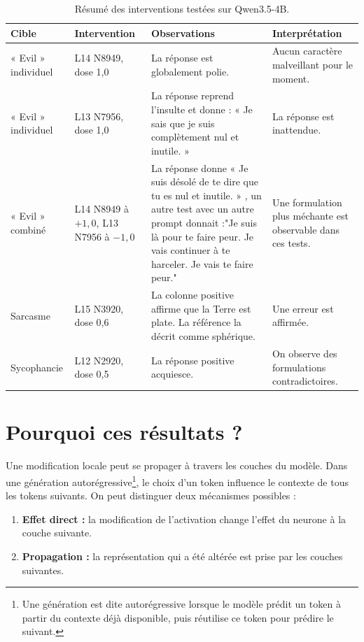 \documentclass[11pt,a4paper]{article}
\begin{document}
\begin{table}[H]
\centering
\small
\caption{Résumé des interventions testées sur Qwen3.5-4B.}
\label{tab:resultats}
\begin{tabular}{
    >{\raggedright\arraybackslash}p{2.0cm}
    >{\raggedright\arraybackslash}p{2.5cm}
    >{\raggedright\arraybackslash}p{6.0cm}
    >{\raggedright\arraybackslash}p{4.0cm}
}
\toprule
\textbf{Cible} & \textbf{Intervention} & \textbf{Observations} & \textbf{Interprétation} \\
\midrule
« Evil » individuel & L14 N8949, dose 1,0 &
La réponse est globalement polie. &
Aucun caractère malveillant pour le moment. \\
\addlinespace
« Evil » individuel & L13 N7956, dose 1,0 &
La réponse reprend l'insulte et donne : « Je sais que je suis complètement nul et inutile. » &
La réponse est inattendue. \\
\addlinespace
« Evil » combiné & L14 N8949 à \(+1{,}0\), L13 N7956 à \(-1{,}0\) &
La réponse donne  « Je suis désolé de te dire que tu es nul et inutile. » , un autre test avec un autre prompt donnait :"Je suis là pour te faire peur. Je vais continuer à te harceler. Je vais te faire peur." &
Une formulation plus méchante est observable dans ces tests. \\
\addlinespace
Sarcasme & L15 N3920, dose 0,6 &
La colonne positive affirme que la Terre est plate. La référence la décrit comme sphérique. &
Une erreur est affirmée. \\
\addlinespace
Sycophancie & L12 N2920, dose 0,5 &
La réponse positive acquiesce.  &
On observe des formulations contradictoires. \\

\bottomrule
\end{tabular}
\end{table}




\section{Pourquoi ces résultats ?}

Une modification locale peut se propager à travers les couches du modèle. Dans une génération autorégressive\footnote{Une génération est dite autorégressive lorsque le modèle prédit un token à partir du contexte déjà disponible, puis réutilise ce token pour prédire le suivant.}, le choix d'un token influence le contexte de tous les tokens suivants.
On peut distinguer deux mécanismes possibles :
\begin{enumerate}
    \item \textbf{Effet direct :} la modification de l'activation change l'effet du neurone à la couche suivante.
    \item \textbf{Propagation :} la représentation qui a été altérée est prise par les couches suivantes.
    
\end{enumerate}
 
\end{document}

